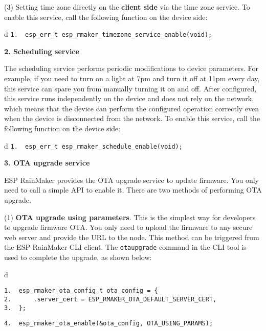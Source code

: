 \documentclass[a4paper,12pt]{book}
\begin{document}
(3) Setting time zone directly on the \textbf{client side} via the time zone service. To enable this service, call the following function on the device side:

\begin{codebloc}
\begin{tabular}{d}
\verb|1.  esp_err_t esp_rmaker_timezone_service_enable(void);|
\end{tabular}
\end{codebloc}

\textbf{2.	Scheduling service}

The scheduling service performs periodic modifications to device parameters. For example, if you need to turn on a light at 7pm and turn it off at 11pm every day, this service can spare you from manually turning it on and off. After configured, this service runs independently on the device and does not rely on the network, which means that the device can perform the configured operation correctly even when the device is disconnected from the network. To enable this service, call the following function on the device side:

\begin{codebloc}
\begin{tabular}{d}
\verb|1.  esp_err_t esp_rmaker_schedule_enable(void);|
\end{tabular}
\end{codebloc}

\textbf{3.	OTA upgrade service}

ESP RainMaker provides the OTA upgrade service to update firmware. You only need to call a simple API to enable it. There are two methods of performing OTA upgrade.

(1) \textbf{OTA upgrade using parameters}. This is the simplest way for developers to upgrade firmware OTA. You only need to upload the firmware to any secure web server and provide the URL to the node. This method can be triggered from the ESP RainMaker CLI client. The \verb|otaupgrade| command in the CLI tool is used to complete the upgrade, as shown below:

\begin{codebloc}
\begin{tabular}{d}
\vspace{2pt}
\begin{verbatim}
1.  esp_rmaker_ota_config_t ota_config = {
2.      .server_cert = ESP_RMAKER_OTA_DEFAULT_SERVER_CERT,
3.  };
\end{verbatim}
\verb|4.  esp_rmaker_ota_enable(&ota_config, OTA_USING_PARAMS);|
\end{tabular}
\end{codebloc}
\end{document}
